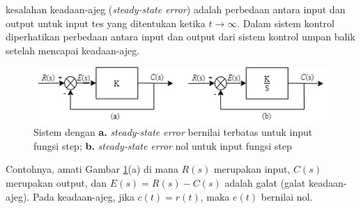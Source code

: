kesalahan keadaan-ajeg (\textit{steady-state error}) adalah perbedaan antara input dan output untuk input tes yang ditentukan ketika $t \rightarrow \infty$. Dalam sistem kontrol diperhatikan perbedaan antara input dan output dari sistem kontrol umpan balik setelah mencapai keadaan-ajeg. \cite{ControlSystemBook}


\begin{figure}[!h]
	\centering
	\includegraphics[width=1\textwidth]{figures/SSEExample}
	\caption{Sistem dengan \textbf{a.} \textit{steady-state error} bernilai terbatas untuk input fungsi step; \textbf{b.} \textit{steady-state error} nol untuk input fungsi step \cite{ControlSystemBook}}
	\label{fig:3:steadystateerror}
\end{figure}

Contohnya, amati Gambar \ref{fig:3:steadystateerror}(a) di mana $R(s)$ merupakan input, $C(s)$ merupakan output, dan $E(s) = R(s) - C(s)$ adalah galat (galat keadaan-ajeg). Pada keadaan-ajeg, jika $c(t) = r(t)$, maka $e(t)$ bernilai nol.



